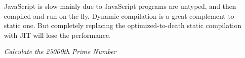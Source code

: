 \documentclass[conference]{IEEEtran}
\begin{document}
%
%

%

JavaScript is slow mainly due to JavaScript programs are untyped, and then compiled and run on the fly. Dynamic compilation is a great complement to static one. But completely replacing the optimized-to-death static compilation with JIT will lose the performance. 
%
%


\begin{algorithm}[hbt!]
	\caption{\scriptsize{\emph{Calculate the 25000th Prime Number}}}
	 \label{algorithm:prime}
	 \begin{algorithmic}[1]
			\Require
			        \EndIf
			    \EndFor
			        \EndIf
			     \EndIf
			  \EndFor
	\end{algorithmic}
\end{algorithm}
\end{document}
